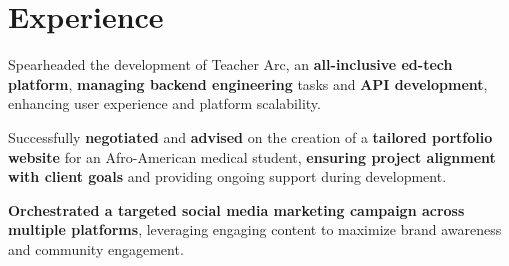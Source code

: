 \documentclass[]{deedy-resume-openfont}
\begin{document}
\hfill
\begin{minipage}[t]{0.66\textwidth} 


\section{Experience}
\sectionsep

\sectionsep

\sectionsep
\begin{tightemize}
\item Spearheaded the development of Teacher Arc, an \textbf{all-inclusive ed-tech platform}, \textbf{managing backend engineering} tasks and \textbf{API development}, enhancing user experience and platform scalability.
\item Successfully \textbf{negotiated} and \textbf{advised} on the creation of a \textbf{tailored portfolio website} for an Afro-American medical student, \textbf{ensuring project alignment with client goals} and providing ongoing support during development.
\item \textbf{Orchestrated a targeted social media marketing campaign across multiple platforms}, leveraging engaging content to maximize brand awareness and community engagement.
\end{tightemize}
\sectionsep


\end{minipage}
\end{document}
